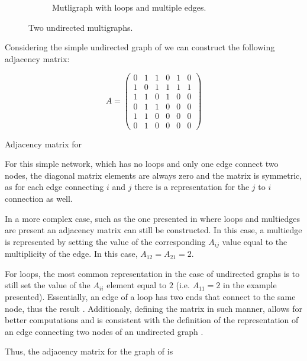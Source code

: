 \begin{figure}
\begin{subfigure}[t]{0.4\textwidth}
         \caption{Mutligraph with loops and multiple edges.}
         \label{fig:compl_adj_demo}
     \end{subfigure}
        \caption{Two undirected multigraphs.}
        \label{fig:two multigraphs}
\end{figure}

Considering the simple undirected graph of  we can construct
the following adjacency matrix:
\begin{table}[H]
  
  \begin{equation*}
    A = 
    \begin{pmatrix}
      0 & 1 & 1 & 0 & 1 & 0 \\
      1 & 0 & 1 & 1 & 1 & 1 \\
      1 & 1 & 0 & 1 & 0 & 0 \\
      0 & 1 & 1 & 0 & 0 & 0 \\
      1 & 1 & 0 & 0 & 0 & 0 \\
      0 & 1 & 0 & 0 & 0 & 0 
    \end{pmatrix}
  \end{equation*}
  \caption{Adjacency matrix for }
\end{table}

For this simple network, which has no loops and only one edge connect two nodes,
the diagonal matrix elements are always zero and the matrix is symmetric, as for
each edge connecting $i$ and $j$ there is a representation for the $j$ to $i$ connection
as well.

In a more complex case, such as the one presented in  where loops
and multiedges are present an adjacency matrix can still be constructed. In this case,
a multiedge is represented by setting the value of the corresponding $A_{ij}$ value equal
to the multiplicity of the edge. In this case, $A_{12} = A_{21} = 2$.

For loops, the most common representation in the case of undirected
graphs is to still set the value of the $A_{ii}$ element equal to $2$
(i.e. $A_{11} = 2$ in the example presented).  Essentially, an edge of
a loop has two ends that connect to the same node, thus the result
\cite[p.~68]{book:algebraic}. Additionaly, defining the matrix in such
manner, allows for better computations and is consistent with the
definition of the representation of an edge connecting two nodes of an
undirected graph \cite[p.~108]{book:Newman}. 

Thus, the adjacency matrix for the graph of  is

